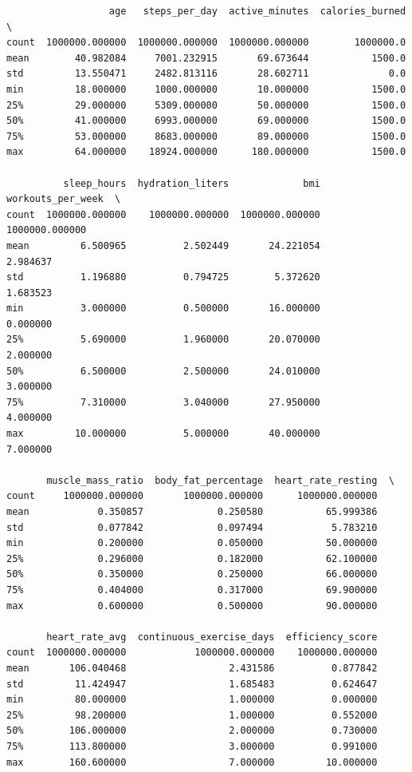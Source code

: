 \begin{lstlisting}
                  age   steps_per_day  active_minutes  calories_burned  \
count  1000000.000000  1000000.000000  1000000.000000        1000000.0   
mean        40.982084     7001.232915       69.673644           1500.0   
std         13.550471     2482.813116       28.602711              0.0   
min         18.000000     1000.000000       10.000000           1500.0   
25%         29.000000     5309.000000       50.000000           1500.0   
50%         41.000000     6993.000000       69.000000           1500.0   
75%         53.000000     8683.000000       89.000000           1500.0   
max         64.000000    18924.000000      180.000000           1500.0   

          sleep_hours  hydration_liters             bmi  workouts_per_week  \
count  1000000.000000    1000000.000000  1000000.000000     1000000.000000   
mean         6.500965          2.502449       24.221054           2.984637   
std          1.196880          0.794725        5.372620           1.683523   
min          3.000000          0.500000       16.000000           0.000000   
25%          5.690000          1.960000       20.070000           2.000000   
50%          6.500000          2.500000       24.010000           3.000000   
75%          7.310000          3.040000       27.950000           4.000000   
max         10.000000          5.000000       40.000000           7.000000   

       muscle_mass_ratio  body_fat_percentage  heart_rate_resting  \
count     1000000.000000       1000000.000000      1000000.000000   
mean            0.350857             0.250580           65.999386   
std             0.077842             0.097494            5.783210   
min             0.200000             0.050000           50.000000   
25%             0.296000             0.182000           62.100000   
50%             0.350000             0.250000           66.000000   
75%             0.404000             0.317000           69.900000   
max             0.600000             0.500000           90.000000   

       heart_rate_avg  continuous_exercise_days  efficiency_score  
count  1000000.000000            1000000.000000    1000000.000000  
mean       106.040468                  2.431586          0.877842  
std         11.424947                  1.685483          0.624647  
min         80.000000                  1.000000          0.000000  
25%         98.200000                  1.000000          0.552000  
50%        106.000000                  2.000000          0.730000  
75%        113.800000                  3.000000          0.991000  
max        160.600000                  7.000000         10.000000  
\end{lstlisting}

